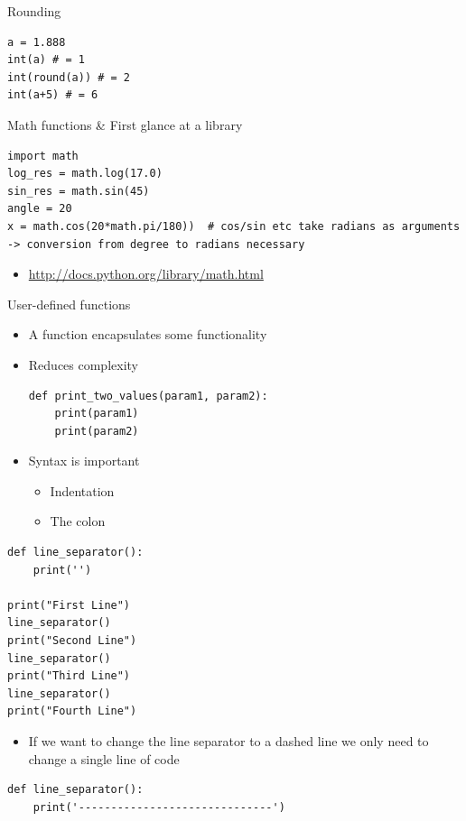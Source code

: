 \documentclass[10pt, a4paper]{beamer} %
\begin{document}
\begin{frame}
\framebreak

\begin{block}{Rounding}
    \begin{lstlisting}
a = 1.888
int(a) # = 1
int(round(a)) # = 2
int(a+5) # = 6
    \end{lstlisting}
\end{block}
\begin{block}{Math functions \& First glance at a library}
    \begin{lstlisting}
import math
log_res = math.log(17.0)
sin_res = math.sin(45)
angle = 20
x = math.cos(20*math.pi/180))  # cos/sin etc take radians as arguments -> conversion from degree to radians necessary      
    \end{lstlisting}
    \begin{itemize}
        \item \tiny \url{http://docs.python.org/library/math.html}
    \end{itemize}
\end{block}

\framebreak

\begin{block}{User-defined functions}
    \begin{itemize}
        \item A function encapsulates some functionality
        \item Reduces complexity
        \begin{lstlisting}
def print_two_values(param1, param2):
    print(param1)
    print(param2)            
        \end{lstlisting}
        \item Syntax is important
        \begin{itemize}
            \item Indentation
            \item The colon
        \end{itemize}
    \end{itemize}
\end{block}
\framebreak
\begin{examples}
    \begin{lstlisting}
def line_separator():
    print('')

print("First Line")
line_separator()
print("Second Line")
line_separator()
print("Third Line")
line_separator()
print("Fourth Line")
\end{lstlisting}
\end{examples}
\begin{itemize}
    \item If we want to change the line separator to a dashed line we only need to change a single line of code
\end{itemize}
\begin{lstlisting}
def line_separator():
    print('------------------------------')
\end{lstlisting}



\end{frame}
\end{document}
